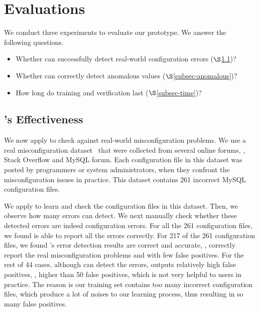 


\section{Evaluations}
\label{sec-eval}

We conduct three experiments to evaluate our \app
prototype. We answer the following
questions.

\begin{itemize}

\item Whether \app can successfully 
  detect real-world configuration errors ($\S$\ref{subsec-effectiveness})?

\item Whether \app can correctly detect anomalous values
($\S$\ref{subsec-anomalous})?

\item How long do training and verification last ($\S$\ref{subsec-time})?

\end{itemize}


\subsection{\app's Effectiveness}
\label{subsec-effectiveness}

We now apply \app to check against real-world misconfiguration problems.
We use a real misconfiguration dataset~\cite{configdataset}
that were collected from several online forums, \eg, 
Stack Overflow and MySQL forum.
Each configuration file in this dataset was posted by 
programmers or system administrators, 
when they confront the misconfiguration issues in practice.
This dataset contains 261 incorrect MySQL configuration files.

We apply \app to learn and check the configuration files in this
dataset. Then, we observe how many errors \app can detect.
We next manually check whether these detected errors are indeed
configuration errors.
For all the 261 configuration files, we found \app is
able to report all the errors correctly.
For 217 of the 261 configuration files, we found \app's 
error detection results are correct and accurate,
\ie, correctly report the real misconfiguration problems
and with few false positives.
For the rest of 44 cases, 
although \app can detect the errors,
\app outputs relatively high false positives,
\eg, higher than 50 false positives,
which is not very helpful to users in practice.
The reason is our training set contains too many incorrect configuration
files, which produce a lot of noises to our learning process,
thus resulting in so many false positives.
  
